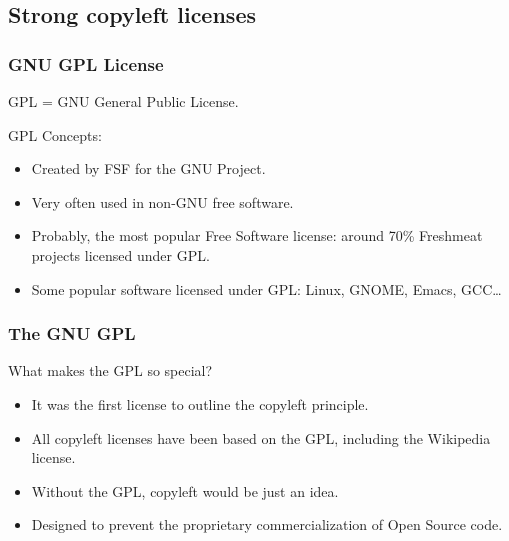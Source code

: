 \subsection{Strong copyleft licenses}

\begin{frame}
\frametitle{GNU GPL License}

\begin{center}
\item GPL = GNU General Public License.
\end{center}

GPL Concepts:
\begin{itemize}
\item Created by FSF for the GNU Project.
\item Very often used in non-GNU free software.
\item Probably, the most popular Free Software license: around 70\%
  Freshmeat projects licensed under GPL.
\item Some popular software licensed under GPL: Linux, GNOME, Emacs,
 GCC\ldots
\end{itemize}

\end{frame}


\begin{frame}
\frametitle{The GNU GPL}
What makes the GPL so special?
\pause
\begin{itemize}
\item It was the first license to outline the copyleft principle.
\item All copyleft licenses have been based on the GPL, including the Wikipedia license.
\item Without the GPL, copyleft would be just an idea. 
\pause
\item Designed to prevent the proprietary commercialization of Open Source code.
\end{itemize}

\end{frame}


